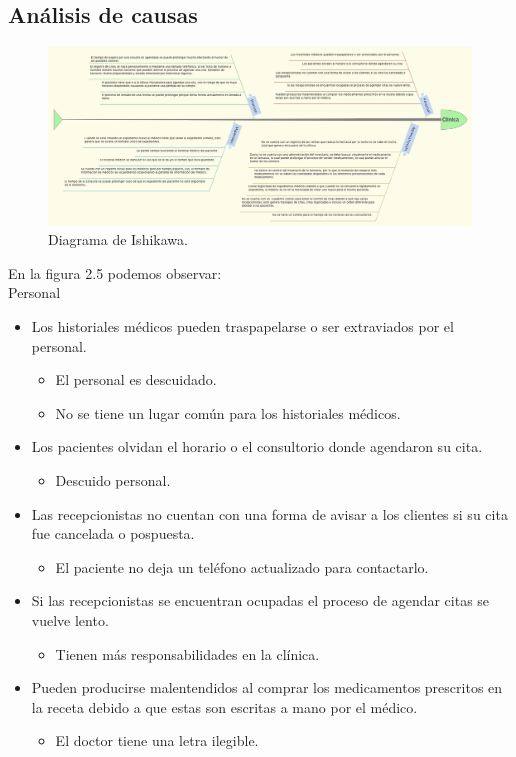 \subsection{Análisis de causas}

\begin{figure}[htbp!]
		\centering
			\includegraphics[width=1\textwidth]{images/Ishikawa}
		\caption{Diagrama de Ishikawa.}
	\end{figure}
    
En la figura 2.5 podemos observar: \\
Personal
\begin{itemize}
	\item Los historiales médicos pueden traspapelarse o ser extraviados por el personal.
    \begin{itemize}
		\item El personal es descuidado.
        \item No se tiene un lugar común para los historiales médicos.
	\end{itemize}
    
    \item Los pacientes olvidan el horario o el consultorio donde agendaron su cita.
	\begin{itemize}
		\item Descuido personal.
	\end{itemize}
    
    \item Las recepcionistas no cuentan con una forma de avisar a los clientes si su cita fue cancelada o pospuesta. 
	\begin{itemize}
		\item El paciente no deja un teléfono actualizado para contactarlo.
	\end{itemize}
    
    \item Si las recepcionistas se encuentran ocupadas el proceso de agendar citas se vuelve lento.
	\begin{itemize}
		\item Tienen más responsabilidades en la clínica.
	\end{itemize}
    
    \item Pueden producirse malentendidos al comprar los medicamentos prescritos en la receta debido a que estas son escritas a mano por el médico.
	\begin{itemize}
		\item El doctor tiene una letra ilegible.  
	\end{itemize}

\end{itemize}

